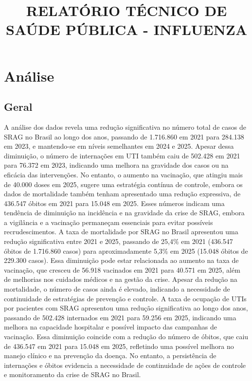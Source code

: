 \documentclass{article}%
\title{\textbf{RELATÓRIO TÉCNICO DE SAÚDE PÚBLICA - INFLUENZA}}%
\begin{document}
%
\normalsize%
\maketitle%
\section{Análise}%
\label{sec:Anlise}%
\subsection{Geral}%
\label{subsec:Geral}%
A análise dos dados revela uma redução significativa no número total de casos de SRAG no Brasil ao longo dos anos, passando de 1.716.860 em 2021 para 284.138 em 2023, e mantendo{-}se em níveis semelhantes em 2024 e 2025. Apesar dessa diminuição, o número de internações em UTI também caiu de 502.428 em 2021 para 76.372 em 2023, indicando uma melhora na gravidade dos casos ou na eficácia das intervenções. No entanto, o aumento na vacinação, que atingiu mais de 40.000 doses em 2025, sugere uma estratégia contínua de controle, embora os dados de mortalidade também tenham apresentado uma redução expressiva, de 436.547 óbitos em 2021 para 15.048 em 2025. Esses números indicam uma tendência de diminuição na incidência e na gravidade da crise de SRAG, embora a vigilância e a vacinação permaneçam essenciais para evitar possíveis recrudescimentos.\newline%
%
A taxa de mortalidade por SRAG no Brasil apresentou uma redução significativa entre 2021 e 2025, passando de 25,4\% em 2021 (436.547 óbitos de 1.716.860 casos) para aproximadamente 5,3\% em 2025 (15.048 óbitos de 229.300 casos). Essa diminuição pode estar relacionada ao aumento na taxa de vacinação, que cresceu de 56.918 vacinados em 2021 para 40.571 em 2025, além de melhorias nos cuidados médicos e na gestão da crise. Apesar da redução na mortalidade, o número de casos ainda é elevado, indicando a necessidade de continuidade de estratégias de prevenção e controle.\newline%
%
A taxa de ocupação de UTIs por pacientes com SRAG apresentou uma redução significativa ao longo dos anos, passando de 502.428 internados em 2021 para 59.256 em 2025, indicando uma melhora na capacidade hospitalar e possível impacto das campanhas de vacinação. Essa diminuição coincide com a redução do número de óbitos, que caiu de 436.547 em 2021 para 15.048 em 2025, refletindo uma possível melhora no manejo clínico e na prevenção da doença. No entanto, a persistência de internações e óbitos evidencia a necessidade de continuidade de ações de controle e monitoramento da crise de SRAG no Brasil.\newline%
\end{document}
